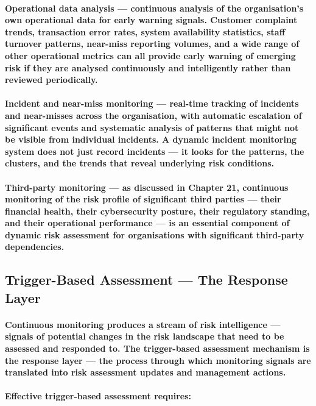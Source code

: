 \paragraph{\textbf{Operational data analysis} — continuous analysis of the organisation's own operational data for early warning signals. Customer complaint trends, transaction error rates, system availability statistics, staff turnover patterns, near-miss reporting volumes, and a wide range of other operational metrics can all provide early warning of emerging risk if they are analysed continuously and intelligently rather than reviewed periodically.}
\paragraph{\textbf{Incident and near-miss monitoring} — real-time tracking of incidents and near-misses across the organisation, with automatic escalation of significant events and systematic analysis of patterns that might not be visible from individual incidents. A dynamic incident monitoring system does not just record incidents — it looks for the patterns, the clusters, and the trends that reveal underlying risk conditions.}
\paragraph{\textbf{Third-party monitoring} — as discussed in Chapter 21, continuous monitoring of the risk profile of significant third parties — their financial health, their cybersecurity posture, their regulatory standing, and their operational performance — is an essential component of dynamic risk assessment for organisations with significant third-party dependencies.}

\subsection{Trigger-Based Assessment — The Response Layer}
\paragraph{Continuous monitoring produces a stream of risk intelligence — signals of potential changes in the risk landscape that need to be assessed and responded to. The \textbf{trigger-based assessment} mechanism is the response layer — the process through which monitoring signals are translated into risk assessment updates and management actions.}
\paragraph{Effective trigger-based assessment requires:}
